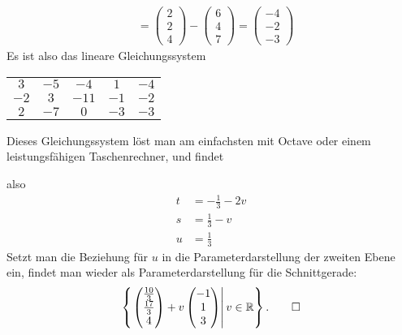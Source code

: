 \begin{loesung}
\begin{align*}
&=
\begin{pmatrix}2\\2\\4\end{pmatrix}
-
\begin{pmatrix}6\\4\\7\end{pmatrix}
=
\begin{pmatrix}-4\\-2\\-3\end{pmatrix}
\end{align*}
Es ist also das lineare Gleichungssystem
\begin{center}
\begin{tabular}{|cccc|c|}
\hline
$ 3$&$-5$&$ -4$&$ 1$&$-4$\\
$-2$&$ 3$&$-11$&$-1$&$-2$\\
$ 2$&$-7$&$  0$&$-3$&$-3$\\
\hline
\end{tabular}
\end{center}
Dieses Gleichungssystem löst man am einfachsten mit Octave oder
einem leistungsfähigen Taschenrechner, und findet

also
\begin{align*}
t&=-\frac13-2v\\
s&=\frac13-v\\
u&=\frac13
\end{align*}
Setzt man die Beziehung für $u$ in die Parameterdarstellung der
zweiten Ebene  ein, findet man wieder als Parameterdarstellung für die
Schnittgerade:
\[
\left\{\left.
\begin{pmatrix}\frac{10}{3}\\\frac{17}{3}\\4\end{pmatrix}
+v
\begin{pmatrix}-1\\1\\3\end{pmatrix}
\right|
v\in\mathbb R
\right\}.
\qedhere
\]
\end{loesung}

